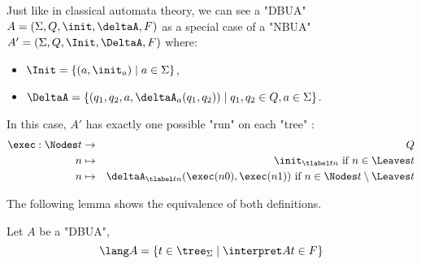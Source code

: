 \documentclass[a4paper,UKenglish,cleveref, autoref, thm-restate]{lipics-v2021}
\begin{document}
\begin{remark}
	Just like in classical automata theory, we can see a "DBUA" $A = (\Sigma, Q, \init, \deltaA, F)$ as a special
	case of a "NBUA" $A' = (\Sigma, Q, \Init, \DeltaA, F)$ where:
	\begin{itemize}
		\item $\Init = \setdef{(a, \init_a)}{a \in \Sigma}$,
		\item $\DeltaA = \setdef{(q_1, q_2, a, \deltaA_a(q_1, q_2))}{q_1, q_2 \in Q, a \in \Sigma}$.
	\end{itemize}

	In this case, $A'$ has exactly one possible "run" on each "tree" :
	\begin{eqnarray*}
		\exec : \Nodes t  &\to & Q \\
		n  &\mapsto& \init_{\tlabel t n} \text{ if } n \in \Leaves t \\
		n  &\mapsto& \deltaA_{\tlabel t n}(\exec (n0), \exec (n1)) \text{ if } n \in \Nodes t  \setminus \Leaves t
	\end{eqnarray*}
\end{remark}


The following lemma shows the equivalence of both definitions.

\begin{lemma}
	Let $A$ be a "DBUA",
	\[ \lang A = \setdef {t \in \tree_{\Sigma}} {\interpret A t \in F} \]
\end{lemma}
\end{document}
